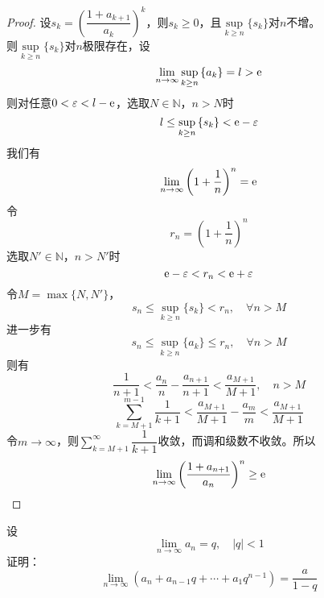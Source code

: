 \begin{proof}

    设$s_k = \left( \dfrac{1 + a_{k + 1}}{a_k} \right)^k$，则$s_k \geq 0$，且$\sup\limits_{k \geq n}\{s_k\}$对$n$不增。\\
    则$\sup\limits_{k\geq n}\{s_k\}$对$n$极限存在，设
    $$\lim\limits_{n \to \infty}{\sup_{k\geq n}{\{a_k\}}} = l >\mathrm{e}$$
    则对任意$0 < \varepsilon < l - \mathrm{e}$，选取$N \in \mathbb{N}$，$n > N$时
    $$l \leq \sup_{k\geq n }{\{s_k\}} < \mathrm{e} - \varepsilon$$
    我们有
    $$\lim\limits_{n \to \infty}{\left( 1 + \dfrac{1}{n} \right)^n} = \mathrm{e}$$
    令
    $$r_n = \left( 1 + \dfrac{1}{n} \right)^n$$
    选取$N' \in \mathbb{N}$，$n > N'$时
    $$\mathrm{e} - \varepsilon < r_n < \mathrm{e} + \varepsilon$$
    令$M = \max\{N,N'\}$，
    $$s_n \leq \sup_{k\geq n}\{s_k\} < r_n, \quad \forall n > M$$
    进一步有
    $$s_n \leq \sup_{k\geq n}\{a_k\} \leq r_n,\quad \forall n > M$$
    则有
    $$\dfrac{1}{n + 1} < \dfrac{a_n}{n} - \dfrac{a_{n + 1}}{n + 1} < \dfrac{a_{M + 1}}{M + 1}, \quad n > M$$
    $$\sum\limits_{k = M + 1}^{m - 1}{\dfrac{1}{k + 1}} < \dfrac{a_{M + 1}}{M + 1} - \dfrac{a_m}{m} < \dfrac{a_{M + 1}}{M + 1}$$
    令$m \to \infty$，则$\sum\limits_{k = M + 1}^{\infty}{\dfrac{1}{k + 1}}$收敛，而调和级数不收敛。所以
    $$\lim\limits_{n \to \infty}{\left( \dfrac{1 + a_{n + 1}}{a_n} \right)^n} \geq \mathrm{e}$$

\end{proof}

\begin{proposition}
    
    设
    $$\lim\limits_{n \to \infty}{a_n} = q, \quad |q| < 1$$
    证明：
    $$\lim\limits_{n \to \infty}{(a_n + a_{n - 1}q + \cdots + a_1q^{n - 1})} = \dfrac{a}{1 - q}$$

\end{proposition}

